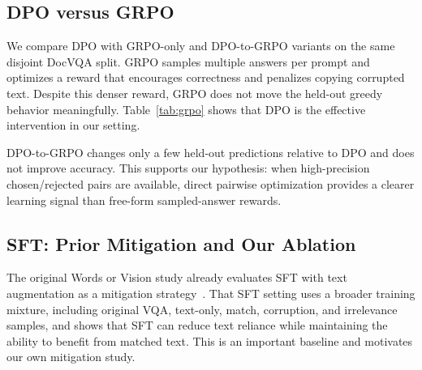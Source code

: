\subsection{DPO versus GRPO}

We compare DPO with GRPO-only and DPO-to-GRPO variants on the same disjoint DocVQA split.
GRPO samples multiple answers per prompt and optimizes a reward that encourages correctness and penalizes copying corrupted text.
Despite this denser reward, GRPO does not move the held-out greedy behavior meaningfully.
Table~\ref{tab:grpo} shows that DPO is the effective intervention in our setting.

\begin{table}[t]
\centering
\caption{GRPO-style optimization does not improve over DPO on DocVQA.}
\label{tab:grpo}
\end{table}

DPO-to-GRPO changes only a few held-out predictions relative to DPO and does not improve accuracy.
This supports our hypothesis: when high-precision chosen/rejected pairs are available, direct pairwise optimization provides a clearer learning signal than free-form sampled-answer rewards.

\subsection{SFT: Prior Mitigation and Our Ablation}

The original Words or Vision study already evaluates SFT with text augmentation as a mitigation strategy~\cite{deng2025words}.
That SFT setting uses a broader training mixture, including original VQA, text-only, match, corruption, and irrelevance samples, and shows that SFT can reduce text reliance while maintaining the ability to benefit from matched text.
This is an important baseline and motivates our own mitigation study.

